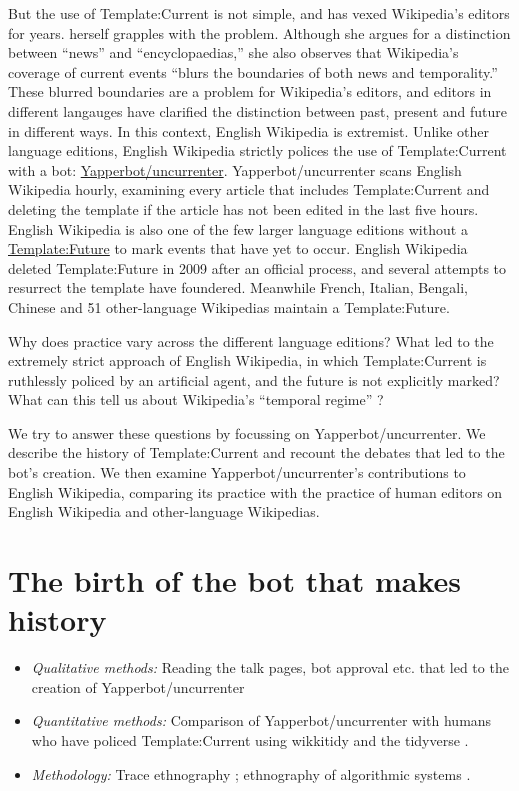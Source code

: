 \documentclass[
  Crown,
  times,
  sageh]{sagej}
\providecommand{\tightlist}{%
  \setlength{\itemsep}{0pt}\setlength{\parskip}{0pt}}
\begin{document}
But the use of Template:Current is not simple, and has vexed Wikipedia's
editors for years. \citet{avieson_breaking_2019} herself grapples with
the problem. Although she argues for a distinction between ``news'' and
``encyclopaedias,'' she also observes that Wikipedia's coverage of
current events ``blurs the boundaries of both news and temporality.''
These blurred boundaries are a problem for Wikipedia's editors, and
editors in different langauges have clarified the distinction between
past, present and future in different ways. In this context, English
Wikipedia is extremist. Unlike other language editions, English
Wikipedia strictly polices the use of Template:Current with a bot:
\href{https://en.wikipedia.org/wiki/User:Yapperbot}{Yapperbot/uncurrenter}.
Yapperbot/uncurrenter scans English Wikipedia hourly, examining every
article that includes Template:Current and deleting the template if the
article has not been edited in the last five hours. English Wikipedia is
also one of the few larger language editions without a
\href{https://wikipedia.org/wiki/Template:Future}{Template:Future} to
mark events that have yet to occur. English Wikipedia deleted
Template:Future in 2009 after an official process, and several attempts
to resurrect the template have foundered. Meanwhile French, Italian,
Bengali, Chinese and 51 other-language Wikipedias maintain a
Template:Future.

Why does practice vary across the different language editions? What led
to the extremely strict approach of English Wikipedia, in which
Template:Current is ruthlessly policed by an artificial agent, and the
future is not explicitly marked? What can this tell us about Wikipedia's
``temporal regime'' \citep{assmann_is_2020}?

We try to answer these questions by focussing on Yapperbot/uncurrenter.
We describe the history of Template:Current and recount the debates that
led to the bot's creation. We then examine Yapperbot/uncurrenter's
contributions to English Wikipedia, comparing its practice with the
practice of human editors on English Wikipedia and other-language
Wikipedias.

\section{The birth of the bot that makes
history}\label{the-birth-of-the-bot-that-makes-history}

\begin{itemize}
\tightlist
\item
  \emph{Qualitative methods:} Reading the talk pages, bot approval etc.
  that led to the creation of Yapperbot/uncurrenter
\item
  \emph{Quantitative methods:} Comparison of Yapperbot/uncurrenter with
  humans who have policed Template:Current using wikkitidy
  \citep{falk_wikkitidy_2023} and the tidyverse
  \citep{wickham_welcome_2019}.
\item
  \emph{Methodology:} Trace ethnography \citep{geiger_trace_2011};
  ethnography of algorithmic systems
  \citep{seaver_algorithms_2017, geiger_beyond_2017}.
\end{itemize}
\end{document}
